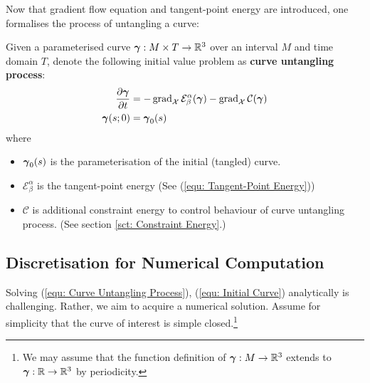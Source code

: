 \documentclass[../dissertation.tex]{subfiles}
\begin{document}
Now that gradient flow equation and tangent-point energy are introduced,
one formalises the process of untangling a curve:

\begin{definition}
    Given a parameterised curve $\boldsymbol{\gamma}:M \times T \rightarrow \mathbb{R}^3$ over an interval $M$ and time domain $T$,
    denote the following initial value problem as \textbf{curve untangling process}:
    \begin{align}
        \frac{\partial \boldsymbol{\gamma}}{\partial t} &= - \operatorname{grad}_{\mathcal{X}} \mathcal{E}_{\beta}^{\alpha} (\boldsymbol{\gamma}) - \operatorname{grad}_{\mathcal{X}} \mathcal{C} (\boldsymbol{\gamma}) 
        \label{equ: Curve Untangling Process}
        \\
        \boldsymbol{\gamma}(s;0) &= \boldsymbol{\gamma}_0 (s)
        \label{equ: Initial Curve}
    \end{align}
    where 
    \begin{itemize}
        \item $\boldsymbol{\gamma}_0 (s)$ is the parameterisation of the initial (tangled) curve. 
        \item $\mathcal{E}_{\beta}^{\alpha}$ is the tangent-point energy (See (\ref{equ: Tangent-Point Energy}))
        \item $\mathcal{C}$ is additional constraint energy to control behaviour of curve untangling process. (See section \ref{sct: Constraint Energy}.)
    \end{itemize}
\end{definition}



\subsection{Discretisation for Numerical Computation}
Solving (\ref{equ: Curve Untangling Process}), (\ref{equ: Initial Curve}) analytically is challenging.
Rather, we aim to acquire a numerical solution.
Assume for simplicity that the curve of interest is simple closed.\footnote{
    We may assume that the function definition of $\boldsymbol{\gamma}:M \rightarrow \mathbb{R}^3$ extends to $\boldsymbol{\gamma}: \mathbb{R} \rightarrow \mathbb{R}^3$ by periodicity.
}
\end{document}
